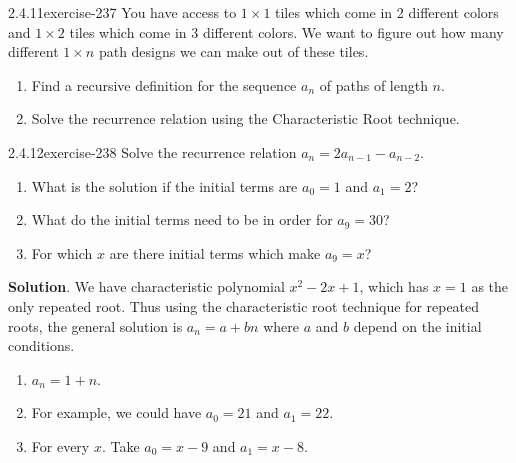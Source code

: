 \documentclass[twoside,11pt,]{book}
\numberwithin{equation}{chapter}
\begin{document}
\begin{divisionsolution}{2.4.11}{}{exercise-237}%
\hypertarget{p-3470}{}%
You have access to \(1 \times 1\) tiles which come in 2 different colors and \(1\times 2\) tiles which come in 3 different colors. We want to figure out how many different \(1 \times n\) path designs we can make out of these tiles.\leavevmode%
\begin{enumerate}[label=(\alph*)]
\item\hypertarget{li-1955}{}\hypertarget{p-3471}{}%
Find a recursive definition for the sequence \(a_n\) of paths of length \(n\).%
\item\hypertarget{li-1956}{}\hypertarget{p-3472}{}%
Solve the recurrence relation using the Characteristic Root technique.%
\end{enumerate}
%
\end{divisionsolution}%
\begin{divisionsolution}{2.4.12}{}{exercise-238}%
\hypertarget{p-3473}{}%
Solve the recurrence relation \(a_n = 2a_{n-1} - a_{n-2}\).\leavevmode%
\begin{enumerate}[label=(\alph*)]
\item\hypertarget{li-1957}{}\hypertarget{p-3474}{}%
What is the solution if the initial terms are \(a_0 = 1\) and \(a_1 = 2\)?%
\item\hypertarget{li-1958}{}\hypertarget{p-3475}{}%
What do the initial terms need to be in order for \(a_9 = 30\)?%
\item\hypertarget{li-1959}{}\hypertarget{p-3476}{}%
For which \(x\) are there initial terms which make \(a_9 = x\)?%
\end{enumerate}
%
\par\smallskip%
\noindent\textbf{Solution}.\quad%
\hypertarget{p-3477}{}%
We have characteristic polynomial \(x^2 - 2x + 1\), which has \(x = 1\) as the only repeated root. Thus using the characteristic root technique for repeated roots, the general solution is \(a_n = a + bn\) where \(a\) and \(b\) depend on the initial conditions.\leavevmode%
\begin{enumerate}[label=(\alph*)]
\item\hypertarget{li-1960}{}\(a_n = 1 + n\).%
\item\hypertarget{li-1961}{}\hypertarget{p-3478}{}%
For example, we could have \(a_0 = 21\) and \(a_1 = 22\).%
\item\hypertarget{li-1962}{}\hypertarget{p-3479}{}%
For every \(x\). Take \(a_0 = x-9\) and \(a_1 = x-8\).%
\end{enumerate}
%
\end{divisionsolution}%
\end{document}
